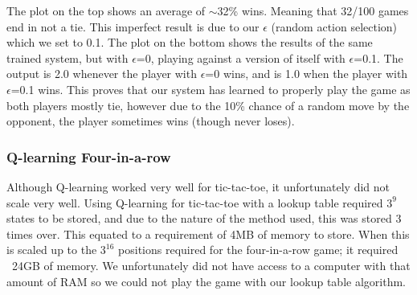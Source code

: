 \documentclass[12pt,a4paper]{article}
\begin{document}
The plot on the top shows an average of $\sim$32\% wins. Meaning that 32/100 games end in not a tie. This imperfect result is due to our $\epsilon$ (random action selection) which we set to 0.1. The plot on the bottom shows the results of the same trained system, but with $\epsilon$=0, playing against a version of itself with $\epsilon$=0.1.
The output is 2.0 whenever the player with $\epsilon$=0 wins, and is 1.0 when the player with $\epsilon$=0.1 wins. This proves that our system has learned to properly play the game as both players mostly tie, however due to the 10\% chance of a random move by the opponent, the player sometimes wins (though never loses).
\subsubsection*{Q-learning Four-in-a-row}
Although Q-learning worked very well for tic-tac-toe, it unfortunately did not scale very well. Using Q-learning for tic-tac-toe with a lookup table required $3^{9}$ states to be stored, and due to the nature of the method used, this was stored 3 times over. This equated to a requirement of 4MB of memory to store. When this is scaled up to the $3^{16}$ positions required for the four-in-a-row game; it required ~24GB of memory. We unfortunately did not have access to a computer with that amount of RAM so we could not play the game with our lookup table algorithm.
\end{document}
